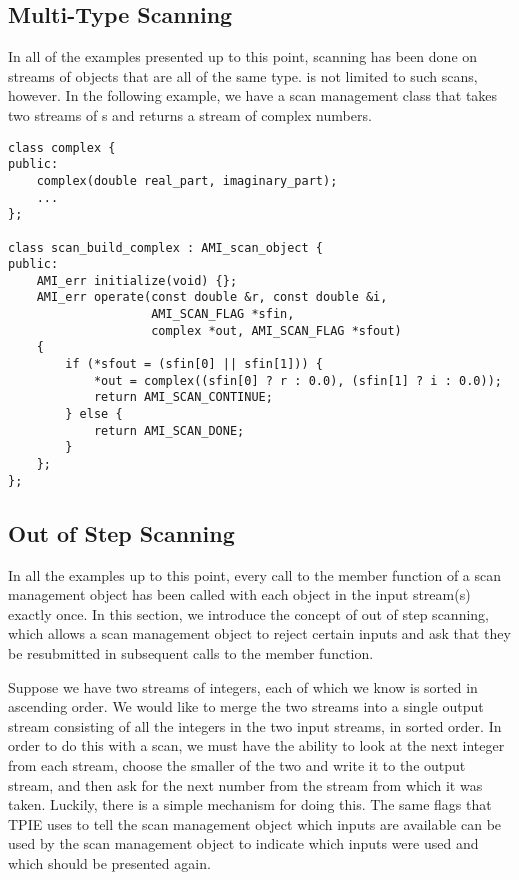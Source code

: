 \subsection{Multi-Type Scanning}


In all of the examples presented up to this point, scanning
has been done on streams of objects that are all of the same
type.   is not limited to such scans,
however.  In the following example, we have a scan
management class that takes two streams of s
and returns a stream of complex numbers.

\begin{verbatim}
class complex {
public:
    complex(double real_part, imaginary_part);
    ...
};

class scan_build_complex : AMI_scan_object {
public:
    AMI_err initialize(void) {};
    AMI_err operate(const double &r, const double &i, 
                    AMI_SCAN_FLAG *sfin,
                    complex *out, AMI_SCAN_FLAG *sfout)
    {
        if (*sfout = (sfin[0] || sfin[1])) {
            *out = complex((sfin[0] ? r : 0.0), (sfin[1] ? i : 0.0));
            return AMI_SCAN_CONTINUE;
        } else {
            return AMI_SCAN_DONE;
        }   
    };
};
\end{verbatim}

\subsection{Out of Step Scanning}
\label{sec:out-of-step}

In all the examples up to this point, every call to the
 member function of a scan management object has been
called with each object in the input stream(s) exactly once.  In this
section, we introduce the concept of out of step scanning, which
allows a scan management object to reject certain inputs and ask that
they be resubmitted in subsequent calls to the  member
function.

Suppose we have two streams of integers, each of which we know is
sorted in ascending order.  We would like to merge the two streams
into a single output stream consisting of all the integers in the two
input streams, in sorted order.  In order to do this with a scan, we
must have the ability to look at the next integer from each stream,
choose the smaller of the two and write it to the output stream, and
then ask for the next number from the stream from which it was taken.
Luckily, there is a simple mechanism for doing this.  The same flags
that TPIE uses to tell the scan management object which inputs are
available can be used by the scan management object to indicate which
inputs were used and which should be presented again.

